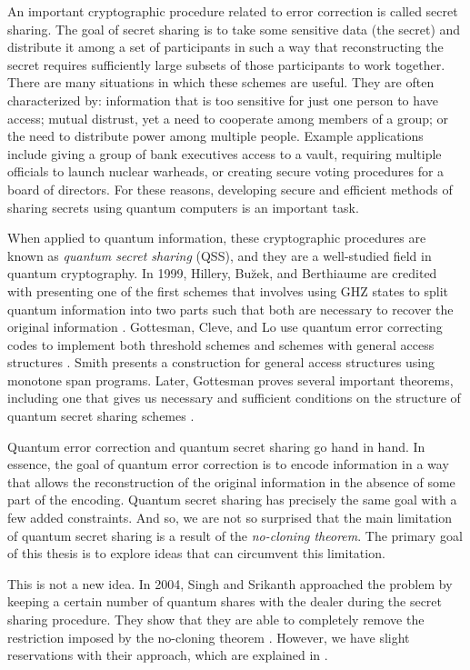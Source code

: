 An important cryptographic procedure related to error correction is called secret sharing. The goal of secret sharing is to take some sensitive data (the secret) and distribute it among a set of participants in such a way that reconstructing the secret requires sufficiently large subsets of those participants to work together. There are many situations in which these schemes are useful. They are often characterized by: information that is too sensitive for just one person to have access; mutual distrust, yet a need to cooperate among members of a group; or the need to distribute power among multiple people. Example applications include giving a group of bank executives access to a vault, requiring multiple officials to launch nuclear warheads, or creating secure voting procedures for a board of directors. For these reasons, developing secure and efficient methods of sharing secrets using quantum computers is an important task. 

When applied to quantum information, these cryptographic procedures are known as \textit{quantum secret sharing} (QSS), and they are a well-studied field in quantum cryptography. In 1999, Hillery, Bu\u{z}ek, and Berthiaume are credited with presenting one of the first schemes that involves using GHZ states to split quantum information into two parts such that both are necessary to recover the original information \cite{hillery_quantum_1999}. Gottesman, Cleve, and Lo use quantum error correcting codes to implement both threshold schemes and schemes with general access structures \cite{cleve_how_1999}. Smith presents a construction for general access structures using monotone span programs. Later, Gottesman proves several important theorems, including one that gives us necessary and sufficient conditions on the structure of quantum secret sharing schemes \cite{gottesman_theory_2000}.

Quantum error correction and quantum secret sharing go hand in hand. In essence, the goal of quantum error correction is to encode information in a way that allows the reconstruction of the original information in the absence of some part of the encoding. Quantum secret sharing has precisely the same goal with a few added constraints. And so, we are not so surprised that the main limitation of quantum secret sharing is a result of the \textit{no-cloning theorem}. The primary goal of this thesis is to explore ideas that can circumvent this limitation.

This is not a new idea. In 2004, Singh and Srikanth approached the problem by keeping a certain number of quantum shares with the dealer during the secret sharing procedure. They show that they are able to completely remove the restriction imposed by the no-cloning theorem \cite{singh_assisted_2004}. However, we have slight reservations with their approach, which are explained in . 

